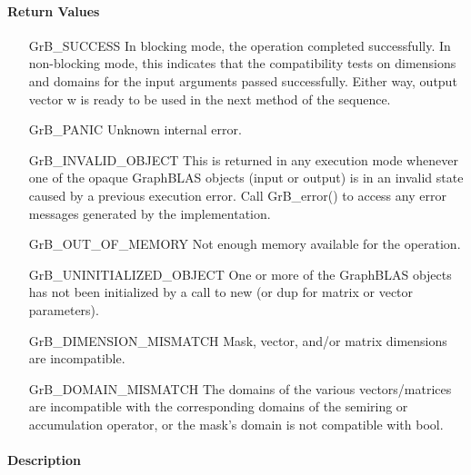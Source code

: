 \paragraph{Return Values}

\begin{itemize}[leftmargin=2.1in]
    \item[{\sf GrB\_SUCCESS}]         In blocking mode, the operation completed
    successfully. In non-blocking mode, this indicates that the compatibility 
    tests on dimensions and domains for the input arguments passed successfully. 
    Either way, output vector {\sf w} is ready to be used in the next method of 
    the sequence.

    \item[{\sf GrB\_PANIC}]           Unknown internal error.

    \item[{\sf GrB\_INVALID\_OBJECT}] This is returned in any execution mode 
    whenever one of the opaque GraphBLAS objects (input or output) is in an invalid 
    state caused by a previous execution error.  Call {\sf GrB\_error()} to access 
    any error messages generated by the implementation.

    \item[{\sf GrB\_OUT\_OF\_MEMORY}] Not enough memory available for the operation.

    \item[{\sf GrB\_UNINITIALIZED\_OBJECT}] One or more of the GraphBLAS objects 
    has not been initialized by a call to {\sf new} (or {\sf dup} for matrix or
    vector parameters).

    \item[{\sf GrB\_DIMENSION\_MISMATCH}] Mask, vector, and/or matrix 
    dimensions are incompatible.

    \item[{\sf GrB\_DOMAIN\_MISMATCH}]    The domains of the various vectors/matrices are
    incompatible with the corresponding domains of the semiring or
    accumulation operator, or the mask's domain is not compatible with {\sf bool}.
\end{itemize}

\paragraph{Description}

